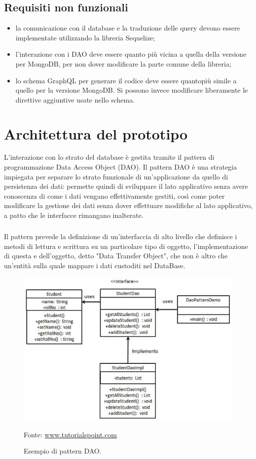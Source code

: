 \documentclass[a4paper, 12pt]{report}
\newcommand{\source}[1]{\caption*{Fonte: {#1}}}
\begin{document}
    \section{Requisiti non funzionali}
      \begin{itemize}
        \item la comunicazione con il database e la traduzione delle query devono essere implementate utilizzando la libreria Sequelize;
        \item l'interazione con i DAO deve essere quanto più vicina a quella della versione per MongoDB, per non dover modificare la parte comune della libreria;
        \item lo schema GraphQL per generare il codice deve essere quantopiù simile a quello per la versione MongoDB. Si possono invece modificare liberamente le direttive aggiuntive usate nello schema.
      \end{itemize}
  \newpage  
  \chapter{Architettura del prototipo}
    L'interazione con lo strato del database è gestita tramite il pattern di programmazione Data Access Object (DAO).
    Il pattern DAO è una strategia impiegata per separare lo strato funzionale di un'applicazione da quello di persistenza dei dati: permette quindi di sviluppare il lato applicativo senza avere conoscenza di come i dati vengano effettivamente gestiti, così come poter modificare la gestione dei dati
    senza dover effettuare modifiche al lato applicativo, a patto che le interfacce rimangano inalterate.
    \paragraph*{}
    Il pattern prevede la definizione di un'interfaccia di alto livello che definisce i metodi di lettura e scrittura su un particolare tipo di oggetto, l'implementazione di questa e dell'oggetto, detto "Data Transfer Object", che non è altro che un'entità sulla quale mappare i dati custoditi nel DataBase.
    \begin{figure}[H]
      \includegraphics[width=\textwidth]{dao_pattern_uml_diagram.jpg}
      \caption{Esempio di pattern DAO.}
      \source{\href{https://www.tutorialspoint.com/design_pattern/images/dao_pattern_uml_diagram.jpg}{www.tutorialspoint.com}}
    \end{figure}
\end{document}

